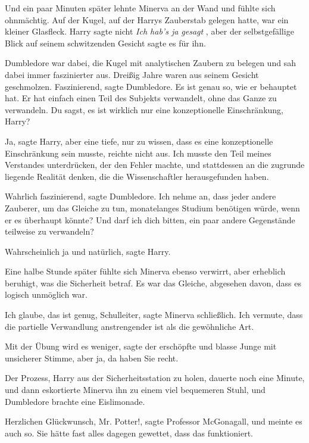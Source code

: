 Und ein paar Minuten später lehnte Minerva an der Wand und fühlte sich
ohnmächtig. Auf der Kugel, auf der Harrys Zauberstab gelegen hatte, war ein
kleiner Glasfleck. Harry sagte nicht \emph{\glqq Ich hab's ja gesagt\grqq{} },
aber der selbstgefällige Blick auf seinem schwitzenden Gesicht sagte es für ihn.

Dumbledore war dabei, die Kugel mit analytischen Zaubern zu belegen und sah
dabei immer faszinierter aus. Dreißig Jahre waren aus seinem Gesicht
geschmolzen. \glqq Faszinierend\grqq{}, sagte Dumbledore. \glqq Es ist genau so,
wie er behauptet hat. Er hat einfach einen Teil des Subjekts verwandelt, ohne
das Ganze zu verwandeln. Du sagst, es ist wirklich nur eine konzeptionelle
Einschränkung, Harry?\grqq{}

\glqq Ja\grqq{}, sagte Harry, \glqq aber eine tiefe, nur zu wissen, dass es eine
konzeptionelle Einschränkung sein musste, reichte nicht aus. Ich musste den Teil
meines Verstandes unterdrücken, der den Fehler machte, und stattdessen an die
zugrunde liegende Realität denken, die die Wissenschaftler herausgefunden
haben.\grqq{}

\glqq Wahrlich faszinierend\grqq{}, sagte Dumbledore. \glqq Ich nehme an, dass
jeder andere Zauberer, um das Gleiche zu tun, monatelanges Studium benötigen
würde, wenn er es überhaupt könnte? Und darf ich dich bitten, ein paar andere
Gegenstände teilweise zu verwandeln?\grqq{}

\glqq Wahrscheinlich ja und natürlich\grqq{}, sagte Harry.

Eine halbe Stunde später fühlte sich Minerva ebenso verwirrt, aber erheblich
beruhigt, was die Sicherheit betraf. Es war das Gleiche, abgesehen davon, dass
es logisch unmöglich war.

\glqq Ich glaube, das ist genug, Schulleiter\grqq{}, sagte Minerva schließlich.
\glqq Ich vermute, dass die partielle Verwandlung anstrengender ist als die
gewöhnliche Art.\grqq{}

\glqq Mit der Übung wird es weniger\grqq{}, sagte der erschöpfte und blasse
Junge mit unsicherer Stimme, \glqq aber ja, da haben Sie recht.\grqq{}

Der Prozess, Harry aus der Sicherheitsstation zu holen, dauerte noch eine
Minute, und dann eskortierte Minerva ihn zu einem viel bequemeren Stuhl, und
Dumbledore brachte eine Eislimonade.

\glqq Herzlichen Glückwunsch, Mr. Potter!\grqq{}, sagte Professor McGonagall,
und meinte es auch so. Sie hätte fast alles dagegen gewettet, dass das
funktioniert.

